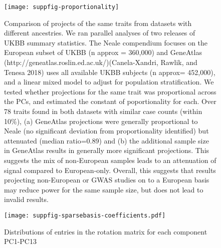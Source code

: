\documentclass[11pt]{article}
\begin{document}
\begin{figure}
   \centering
 \texttt{[image: suppfig-proportionality]}
   \caption{Comparison of projects of the same traits from datasets with different ancestries.
     We ran parallel analyses of %
     two releases of UKBB summary statistics. The Neale compendium focuses on the European subset of UKBB (n approx = 360,000) and GeneAtlas (http://geneatlas.roslin.ed.ac.uk/)(Canela-Xandri, Rawlik, and Tenesa 2018) uses all available UKBB subjects (n approx= 452,000), and a linear mixed model to adjust for population stratification. We tested whether projections for the same trait was proportional across the PCs, and estimated the constant of poportionality for each.  Over 78 traits found in both datasets with similar case counts (within 10\%), (a) GeneAtlas projections were generally proportional to Neale (no significant deviation from proportionality identified) but attenuated (median ratio=0.89) and (b) the additional sample size in GeneAtlas results in generally more significant projections. This suggests the mix of non-European samples leads to an attenuation of signal compared to European-only.  Overall, this suggests that results projecting non-European or GWAS studies on to a European basis may reduce power for the same sample size, but does not lead to invalid results.  }
  \label{sfig:2}
\end{figure}

\begin{figure}
  \centering
  \texttt{[image: suppfig-sparsebasis-coefficients.pdf]}
  \caption{Distributions of entries in the rotation matrix for each component PC1-PC13}
  \label{sfig:2}
\end{figure}


 
\end{document}
